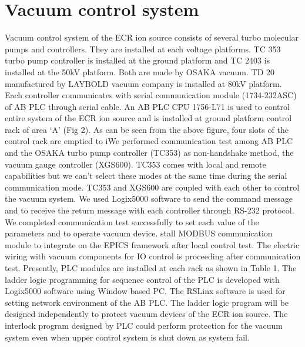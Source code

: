 \documentclass[a4paper,
              ]{jacow}
\begin{document}
\section{Vacuum control system}
Vacuum control system of the ECR ion source consists of several turbo molecular pumps and controllers. They are installed at each voltage platforms. TC 353 turbo pump controller is installed at the ground platform and TC 2403 is installed at the 50kV platform. Both are made by OSAKA vacuum. TD 20 manufactured by LAYBOLD vacuum company is installed at 80kV platform. Each controller communicates with serial communication module (1734-232ASC) of AB PLC through serial cable.   
An AB PLC CPU 1756-L71 is used to control entire system of the ECR ion source and is installed at ground platform control rack of area ‘A’ (Fig 2). As can be seen from the above figure, four slots of the control rack are emptied to iWe performed communication test among AB PLC and the OSAKA turbo pump controller (TC353) as non-handshake method, the vacuum gauge controller (XGS600). TC353 comes with local and remote capabilities but we can’t select these modes at the same time during the serial communication mode. TC353 and XGS600 are coupled with each other to control the vacuum system. We used Logix5000 software to send the command message and to receive the return message with each controller through RS-232 protocol. We completed communication test successfully to set each value of the parameters and to operate vacuum device.  stall MODBUS communication module to integrate on the EPICS framework after local control test.
The electric wiring with vacuum components for IO control is proceeding after communication test. Presently, PLC modules are installed at each rack as shown in Table 1.
The ladder logic programming for sequence control of the PLC is developed with Logix5000 software using Window based PC. The RSLinx software is used for setting network environment of the AB PLC. The ladder logic program will be designed independently to protect vacuum devices of the ECR ion source. The interlock program designed by PLC could perform protection for the vacuum system even when upper control system is shut down as system fail.
\end{document}
